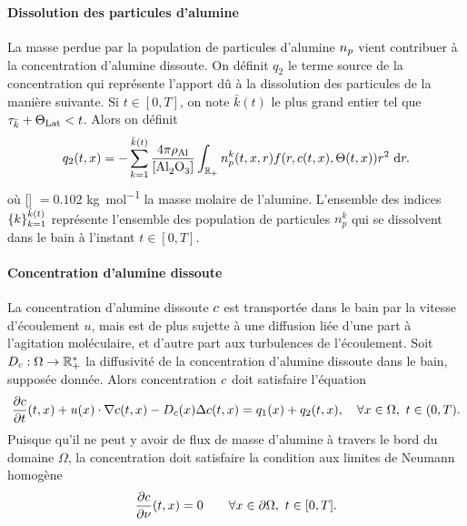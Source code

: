 \paragraph{Dissolution des particules d'alumine}
La masse perdue par la population de particules d'alumine
$n_p$ vient contribuer à la concentration d'alumine
dissoute. On définit $q_2$ le terme source de la concentration
qui représente l'apport dû à la dissolution des particules de la
manière suivante. Si $t \in [0, T]$, on note $\bar k(t)$ le plus grand
entier tel que $\tau_{\bar k} + \Theta_\text{Lat} < t$. Alors on définit
\begin{equation}
  q_2(t, x) = -\sum_{k = 1}^{\bar
    k(t)}\frac{4\pi\aluminadensity}{[\ce{Al2O3}]}\int_{\rplus}n_p^k(t,
  x, r)f(r, \concentration(t, x), \temperature(t, x))r^2\,\intd{r}.
\end{equation}
où [] $ = \num{0.102}$ \si{\kilo\gram\per\mol} la masse
molaire de l'alumine. L'ensemble des indices $\left\{ k \right\}_{k =
  1}^{\bar k(t)}$ représente l'ensemble des population de particules
$n_p^k$ qui se dissolvent dans le bain à l'instant $t\in[0, T]$.

\paragraph{Concentration d'alumine dissoute}
La concentration d'alumine dissoute $c$ est transportée
dans le bain par la vitesse d'écoulement $u$, mais est de plus sujette
à une diffusion liée d'une part à l'agitation moléculaire, et d'autre
part aux turbulences de l'écoulement. Soit
$D_c:\Omega\to\mathbb R^*_+$ la diffusivité de la
concentration d'alumine dissoute dans le bain, supposée donnée. Alors
concentration $c$ doit satisfaire l'équation
\begin{equation}\label{eq:concentration}
  \frac{\partial c}{\partial t}(t, x) + u(x)\cdot\nabla c(t, x) - D_c(x)
  \Delta c(t, x) = q_1(x) + q_2(t, x),\quad \forall
  x\in\Omega,\ t\in (0, T).
\end{equation}
Puisque qu'il ne peut y avoir de flux de masse d'alumine à travers le
bord du domaine $\Omega$, la concentration doit satisfaire la
condition aux limites de Neumann homogène
\begin{equation}\label{eq:c-bc}
  \frac{\partial c}{\partial \nu}(t, x) = 0 \quad  \quad
  \forall x\in\partial \Omega,\ t\in[0, T].
\end{equation}

